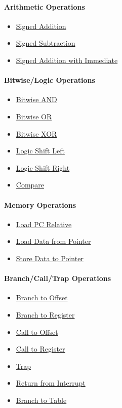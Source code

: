 \paragraph{Arithmetic Operations}
\begin{itemize}
\nolistskip
\item \hyperref[instr_add]{Signed Addition}
\item \hyperref[instr_sub]{Signed Subtraction}
\item \hyperref[instr_addi]{Signed Addition with Immediate}
\end{itemize}
\paragraph{Bitwise/Logic Operations}
\begin{itemize}
\nolistskip
\item \hyperref[instr_and]{Bitwise AND}
\item \hyperref[instr_or]{Bitwise OR}
\item \hyperref[instr_xor]{Bitwise XOR}
\item \hyperref[instr_lsh]{Logic Shift Left}
\item \hyperref[instr_rsh]{Logic Shift Right}
\item \hyperref[instr_cmp]{Compare}
\end{itemize}
\paragraph{Memory Operations}
\begin{itemize}
\nolistskip
\item \hyperref[instr_ldr]{Load PC Relative}
\item \hyperref[instr_ld]{Load Data from Pointer}
\item \hyperref[instr_st]{Store Data to Pointer}
\end{itemize}
\paragraph{Branch/Call/Trap Operations}
\begin{itemize}
\nolistskip
\item \hyperref[instr_bri]{Branch to Offset}
\item \hyperref[instr_brr]{Branch to Register}
\item \hyperref[instr_calli]{Call to Offset}
\item \hyperref[instr_callr]{Call to Register}
\item \hyperref[instr_trap]{Trap}
\item \hyperref[instr_reti]{Return from Interrupt}
\item \hyperref[instr_brt]{Branch to Table}
\end{itemize}
